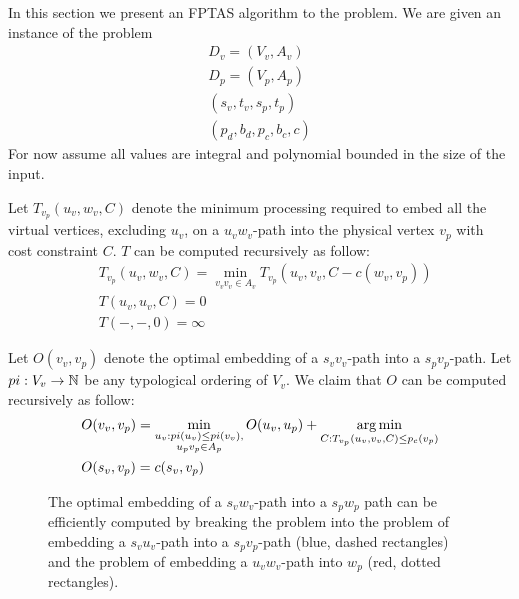 In this section we present an FPTAS algorithm to the \VPN problem.
We are given an instance of the \VPN problem 
\begin{align*}
D_v = (V_v, A_v)		\\
D_p = (V_p, A_p)		\\
(s_v, t_v, s_p, t_p)	\\
(p_d, b_d, p_c, b_c, c)
\end{align*}
For now assume all values are integral and polynomial bounded in the size of the input.

Let $T_{v_p}(u_v, w_v, C)$ denote the minimum processing required to embed
all the virtual vertices, excluding $u_v$, on a $u_vw_v$-path into the physical
vertex $v_p$ with cost constraint $C$.
$T$ can be computed recursively as follow:
\begin{align*}
&T_{v_p}(u_v, w_v, C) = 
\min_{v_vv_v \in A_v} T_{v_p}(u_v, v_v, C - c(w_v, v_p))
\\
&T(u_v, u_v, C) = 0
\\
&T(-, -, 0) = \infty
\end{align*}
 
Let $O(v_v, v_p)$ denote the optimal embedding of a $s_vv_v$-path into a
$s_pv_p$-path.
Let $pi:V_v \to \mathbb{N}$ be any typological ordering of $V_v$. 
We claim that $O$ can be computed recursively as follow:
\begin{align*}
&O(v_v, v_p) = 
\min_{\substack{
u_v : pi(u_v) \leq pi(v_v), 
\\
u_pv_p \in A_p
}}
O(u_v, u_p)
+
\operatorname*{arg\,min}_{C : T_{v_p}(u_v, v_v, C) \leq p_c(v_p)}
\\
&O(s_v, v_p) = c(s_v, v_p)
\end{align*}

\begin{figure}[ht]
\centering

\caption[]{
The optimal embedding of a $s_vw_v$-path into a $s_pw_p$ path can be efficiently 
computed by breaking the problem into the problem of embedding a $s_vu_v$-path
into a $s_pv_p$-path (blue, dashed rectangles) 
and the problem of embedding a $u_vw_v$-path into $w_p$ (red, dotted
rectangles).
}
\end{figure}


